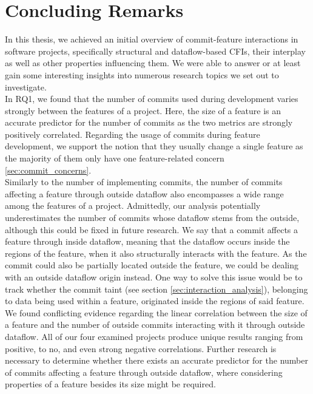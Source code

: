 \chapter{Concluding Remarks}\label{ch:conclusion}

In this thesis, we achieved an initial overview of commit-feature interactions in software projects, specifically structural and dataflow-based CFIs, their interplay as well as other properties influencing them.
We were able to answer or at least gain some interesting insights into numerous research topics we set out to investigate. \\
In RQ1, we found that the number of commits used during development varies strongly between the features of a project.
Here, the size of a feature is an accurate predictor for the number of commits as the two metrics are strongly positively correlated.
Regarding the usage of commits during feature development, we support the notion that they usually change a single feature as the majority of them only have one feature-related concern \ref{sec:commit_concerns}. \\
Similarly to the number of implementing commits, the number of commits affecting a feature through outside dataflow also encompasses a wide range among the features of a project.
Admittedly, our analysis potentially underestimates the number of commits whose dataflow stems from the outside, although this could be fixed in future research.
We say that a commit affects a feature through inside dataflow, meaning that the dataflow occurs inside the regions of the feature, when it also structurally interacts with the feature.
As the commit could also be partially located outside the feature, we could be dealing with an outside dataflow origin instead.
One way to solve this issue would be to track whether the commit taint (see section \ref{sec:interaction_analysis}), belonging to data being used within a feature, originated inside the regions of said feature. \\
We found conflicting evidence regarding the linear correlation between the size of a feature and the number of outside commits interacting with it through outside dataflow.
All of our four examined projects produce unique results ranging from positive, to no, and even strong negative correlations.
Further research is necessary to determine whether there exists an accurate predictor for the number of commits affecting a feature through outside dataflow, where considering properties of a feature besides its size might be required.
